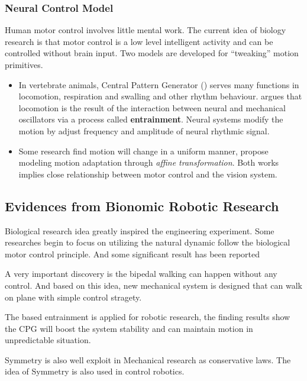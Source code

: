 \subsubsection{Neural Control Model}
Human motor control involves little mental work.
The current idea of biology research is that motor control is a low level intelligent activity and can be controlled  without brain input. 
Two models are developed for ``tweaking'' motion primitives.
\begin{itemize}
\item
In vertebrate animals,  Central Pattern Generator (\cpg) serves many functions in locomotion, respiration and swalling and other rhythm behaviour.
\citet{Cohen1988a} argues that locomotion is the result of the interaction between neural and mechanical oscillators via a process called \textbf{entrainment}.
Neural systems modify the motion by adjust frequency and amplitude of neural rhythmic signal.



\item
Some research find motion will change in a uniform manner\citep{Viviani1992},\citep{flash2007affine} propose modeling motion adaptation through \emph{affine transformation}.
Both works implies close relationship between motor control and the vision system.
\end{itemize}









\subsection{ Evidences from Bionomic Robotic Research}
Biological research idea greatly inspired the engineering experiment.
Some researches begin to focus on utilizing the natural dynamic follow the biological motor control principle.
And some significant result has been reported
\begin{itemize}
A very important discovery is the bipedal walking can happen without any control\citep{McGeer1990}.  
And based on this idea, new mechanical system is designed that can walk on plane with simple control stragety\citep{Collins2005}.

The \cpg based entrainment is applied for robotic research\citep{Williamson1999a}, the finding results show the CPG will boost the system stability and can maintain motion in unpredictable situation.

Symmetry is also well exploit in Mechanical research as conservative laws.
The idea of Symmetry is also used in control robotics\citep{spong2005controlled}.
\end{itemize}

